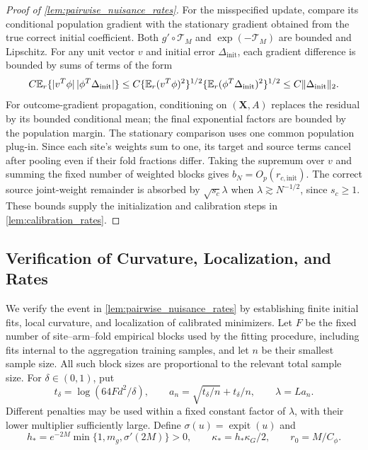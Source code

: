 \documentclass[12pt]{article}
\begin{document}
\begin{proof}[Proof of \cref{lem:pairwise_nuisance_rates}]
For the misspecified update, compare its conditional population gradient with the stationary gradient obtained from the true correct initial coefficient. Both $g'\circ\mathcal T_M$ and $\exp(-\mathcal T_M)$ are bounded and Lipschitz. For any unit vector $v$ and initial error $\Delta_{\mathrm{init}}$, each gradient difference is bounded by sums of terms of the form
\[
C\mathbb{E}_r\{|v^T\phi|\,|\phi^T\Delta_{\mathrm{init}}|\}
\le C\{\mathbb{E}_r(v^T\phi)^2\}^{1/2}
       \{\mathbb{E}_r(\phi^T\Delta_{\mathrm{init}})^2\}^{1/2}
\le C\|\Delta_{\mathrm{init}}\|_2.
\]
For outcome-gradient propagation, conditioning on $(\boldsymbol X,A)$ replaces the residual by its bounded conditional mean; the final exponential factors are bounded by the population margin. The stationary comparison uses one common population plug-in. Since each site's weights sum to one, its target and source terms cancel after pooling even if their fold fractions differ. Taking the supremum over $v$ and summing the fixed number of weighted blocks gives $b_N=O_p(r_{c,\mathrm{init}})$. The correct source joint-weight remainder is absorbed by $\sqrt{s_c}\lambda$ when $\lambda\gtrsim N^{-1/2}$, since $s_c\ge1$. These bounds supply the initialization and calibration steps in \cref{lem:calibration_rates}.
\end{proof}

\subsection{Verification of Curvature, Localization, and Rates}\label{supp:primitive_verification}
We verify the event in \cref{lem:pairwise_nuisance_rates} by establishing finite initial fits, local curvature, and localization of calibrated minimizers.
Let $F$ be the fixed number of site--arm--fold empirical blocks used by the fitting procedure, including fits internal to the aggregation training samples, and let $n$ be their smallest sample size. All such block sizes are proportional to the relevant total sample size. For $\delta\in(0,1)$, put
\begin{equation}\label{eq:primitive_penalty}
t_\delta=\log(64Fd^2/\delta),\qquad
a_n=\sqrt{t_\delta/n}+t_\delta/n,\qquad
\lambda=L a_n.
\end{equation}
Different penalties may be used within a fixed constant factor of $\lambda$, with their lower multiplier sufficiently large. Define $\sigma(u)=\operatorname{expit}(u)$ and
\[
h_*=e^{-2M}\min\{1,m_g,\sigma'(2M)\}>0,
\qquad \kappa_*=h_*\kappa_G/2,\qquad r_0=M/C_\phi.
\]
\end{document}
